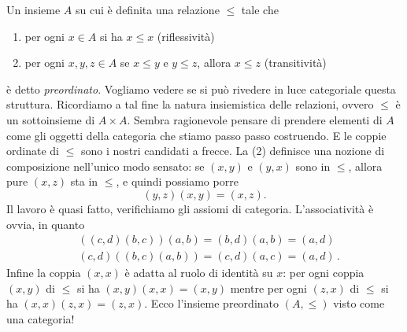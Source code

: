 \begin{esempio}\label{esempio:PreOrdsAreCats}
Un insieme \(A\) su cui è definita una relazione \(\leqslant\) tale che
\begin{enumerate}
\item per ogni \(x \in A\) si ha \(x \leqslant x\) (riflessività)
\item per ogni \(x,y,z \in A\) se \(x \leqslant y\) e \(y \leqslant z\), allora \(x \leqslant z\) (transitività)
\end{enumerate}
è detto {\em preordinato}. Vogliamo vedere se si può rivedere in luce categoriale questa struttura.\newline
Ricordiamo a tal fine la natura insiemistica delle relazioni, ovvero \(\leqslant\) è un sottoinsieme di \(A \times A\). Sembra ragionevole pensare di prendere elementi di \(A\) come gli oggetti della categoria che stiamo passo passo costruendo. E le coppie ordinate di \(\leqslant\) sono i nostri candidati a frecce. La (2) definisce una nozione di composizione nell'unico modo sensato: se \((x, y)\) e \((y, x)\) sono in \(\leqslant\), allora pure \((x, z)\) sta in \(\leqslant\), e quindi possiamo porre
\[(y, z) (x, y) = (x, z) .\]
Il lavoro è quasi fatto, verifichiamo gli assiomi di categoria. L'associatività è ovvia, in quanto
\begin{align*}
& ((c, d)(b, c))(a, b) = (b, d)(a, b) = (a, d) \\
& (c, d)((b, c)(a, b)) = (c, d)(a, c) = (a, d) \,.
\end{align*}
Infine la coppia \((x, x)\) è adatta al ruolo di identità su \(x\): per ogni coppia \((x, y)\) di \(\leqslant\) si ha \((x, y)(x, x) = (x, y)\) mentre per ogni \((z, x)\) di \(\leqslant\) si ha \((x, x)(z, x) = (z, x)\). Ecco l'insieme preordinato \((A, \leqslant)\) visto come una categoria!
\end{esempio}

